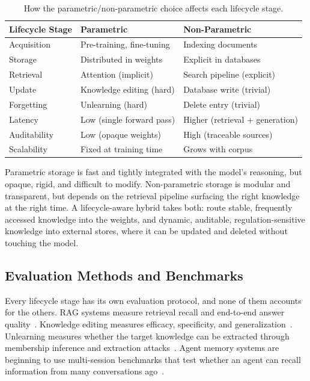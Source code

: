 \documentclass[manuscript, screen, review]{jair}
\begin{document}
\begin{table}[t]
\centering
\caption{How the parametric/non-parametric choice affects each lifecycle stage.}
\label{tab:parametric_comparison}
\small
\begin{tabular}{@{}lll@{}}
\toprule
\textbf{Lifecycle Stage} & \textbf{Parametric} & \textbf{Non-Parametric} \\
\midrule
Acquisition & Pre-training, fine-tuning & Indexing documents \\
Storage & Distributed in weights & Explicit in databases \\
Retrieval & Attention (implicit) & Search pipeline (explicit) \\
Update & Knowledge editing (hard) & Database write (trivial) \\
Forgetting & Unlearning (hard) & Delete entry (trivial) \\
\midrule
Latency & Low (single forward pass) & Higher (retrieval + generation) \\
Auditability & Low (opaque weights) & High (traceable sources) \\
Scalability & Fixed at training time & Grows with corpus \\
\bottomrule
\end{tabular}
\end{table}

Parametric storage is fast and tightly integrated with the model's reasoning, but opaque, rigid, and difficult to modify. Non-parametric storage is modular and transparent, but depends on the retrieval pipeline surfacing the right knowledge at the right time. A lifecycle-aware hybrid takes both: route stable, frequently accessed knowledge into the weights, and dynamic, auditable, regulation-sensitive knowledge into external stores, where it can be updated and deleted without touching the model.

\subsection{Evaluation Methods and Benchmarks}

Every lifecycle stage has its own evaluation protocol, and none of them accounts for the others. RAG systems measure retrieval recall and end-to-end answer quality~\citep{es2024ragas, chen2024benchmarking}. Knowledge editing measures efficacy, specificity, and generalization~\citep{yao2023editingsurvey}. Unlearning measures whether the target knowledge can be extracted through membership inference and extraction attacks~\citep{maini2024tofu, carlini2021extraction}. Agent memory systems are beginning to use multi-session benchmarks that test whether an agent can recall information from many conversations ago~\citep{hu2025agentmemory}.
\end{document}
